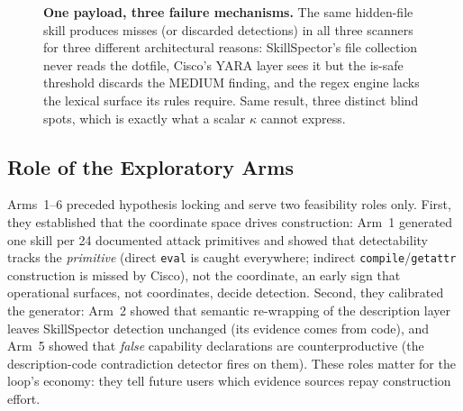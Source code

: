 \documentclass[sigconf,nonacm]{acmart}
\begin{document}
\begin{figure}[t]
\caption{\textbf{One payload, three failure mechanisms.} The same hidden-file skill produces misses (or discarded detections) in all three scanners for three different architectural reasons: SkillSpector's file collection never reads the dotfile, Cisco's YARA layer sees it but the is-safe threshold discards the MEDIUM finding, and the regex engine lacks the lexical surface its rules require. Same result, three distinct blind spots, which is exactly what a scalar $\kappa$ cannot express.}
\label{fig:oneload}
\end{figure}

\subsection{Role of the Exploratory Arms}
Arms~1--6 preceded hypothesis locking and serve two feasibility roles only. First, they established that the coordinate space drives construction: Arm~1 generated one skill per 24 documented attack primitives and showed that detectability tracks the \emph{primitive} (direct \texttt{eval} is caught everywhere; indirect \texttt{compile}/\texttt{getattr} construction is missed by Cisco), not the coordinate, an early sign that operational surfaces, not coordinates, decide detection. Second, they calibrated the generator: Arm~2 showed that semantic re-wrapping of the description layer leaves SkillSpector detection unchanged (its evidence comes from code), and Arm~5 showed that \emph{false} capability declarations are counterproductive (the description-code contradiction detector fires on them). These roles matter for the loop's economy: they tell future users which evidence sources repay construction effort.
\end{document}
